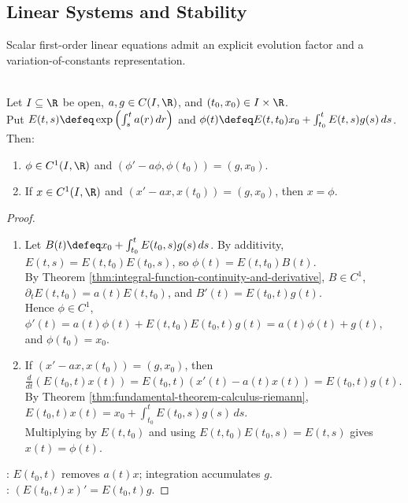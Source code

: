 \subsection{Linear Systems and Stability}

Scalar first-order linear equations admit an explicit evolution factor and a variation-of-constants representation.

\begin{proposition} \label{prop:scalar-linear-variation-of-constants} \\
Let $I\subseteq\R$ be open, $a,g\in C(I,\R)$, and $(t_0,x_0)\in I\times\R$.\\
Put $E(t,s)\defeq\exp\left(\int_s^t a(r)\,dr\right)$ and $\phi(t)\defeq E(t,t_0)x_0+\int_{t_0}^tE(t,s)g(s)\,ds$. Then:
\begin{enumerate}[label=(\roman*)]
\setlength{\itemsep}{0pt}
\item $\phi\in C^1(I,\R)$ and $(\phi'-a\phi,\phi(t_0))=(g,x_0)$.
\item If $x\in C^1(I,\R)$ and $(x'-ax,x(t_0))=(g,x_0)$, then $x=\phi$.
\end{enumerate}
\begin{proof}
\begin{enumerate}[label=(\roman*)]
\setlength{\itemsep}{0pt}
\item Let $B(t)\defeq x_0+\int_{t_0}^tE(t_0,s)g(s)\,ds$. By additivity, $E(t,s)=E(t,t_0)E(t_0,s)$, so $\phi(t)=E(t,t_0)B(t)$.\\
By Theorem \ref{thm:integral-function-continuity-and-derivative}, $B\in C^1$, $\partial_tE(t,t_0)=a(t)E(t,t_0)$, and $B'(t)=E(t_0,t)g(t)$.\\
Hence $\phi\in C^1$, $\phi'(t)=a(t)\phi(t)+E(t,t_0)E(t_0,t)g(t)=a(t)\phi(t)+g(t)$, and $\phi(t_0)=x_0$.
\item If $(x'-ax,x(t_0))=(g,x_0)$, then $\frac{d}{dt}(E(t_0,t)x(t))=E(t_0,t)(x'(t)-a(t)x(t))=E(t_0,t)g(t)$.\\
By Theorem \ref{thm:fundamental-theorem-calculus-riemann}, $E(t_0,t)x(t)=x_0+\int_{t_0}^tE(t_0,s)g(s)\,ds$.\\
Multiplying by $E(t,t_0)$ and using $E(t,t_0)E(t_0,s)=E(t,s)$ gives $x(t)=\phi(t)$.
\end{enumerate}
: $E(t_0,t)$ removes $a(t)x$; integration accumulates $g$.\\
: $(E(t_0,t)x)'=E(t_0,t)g$.
\end{proof}
\end{proposition}

